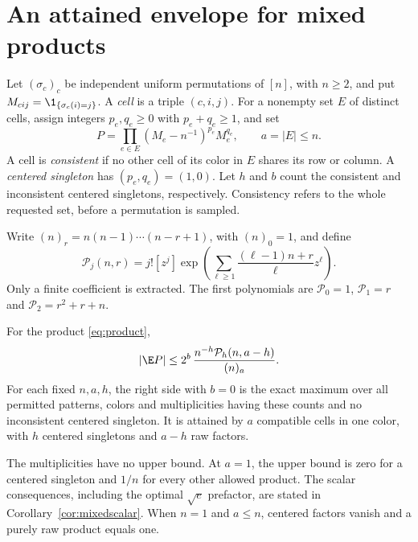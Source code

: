 \section{An attained envelope for mixed products}\label{sec:mixed}

Let $(\sigma_c)_c$ be independent uniform permutations of $[n]$, with $n\ge2$, and put $M_{cij}=\1_{\{\sigma_c(i)=j\}}$. A \emph{cell} is a triple $(c,i,j)$. For a nonempty set $E$ of distinct cells, assign integers $p_e,q_e\ge0$ with $p_e+q_e\ge1$, and set
\begin{equation}\label{eq:product}
P=\prod_{e\in E}(M_e-n^{-1})^{p_e}M_e^{q_e},\qquad a=|E|\le n.
\end{equation}
A cell is \emph{consistent} if no other cell of its color in $E$ shares its row or column. A \emph{centered singleton} has $(p_e,q_e)=(1,0)$. Let $h$ and $b$ count the consistent and inconsistent centered singletons, respectively. Consistency refers to the whole requested set, before a permutation is sampled.

Write $(n)_r=n(n-1)\cdots(n-r+1)$, with $(n)_0=1$, and define
\begin{equation}\label{eq:depletedpoly}
\mathcal P_j(n,r)
=j![z^j]\exp\left(\sum_{\ell\ge1}
\frac{(\ell-1)n+r}{\ell}z^\ell\right).
\end{equation}
Only a finite coefficient is extracted. The first polynomials are
$\mathcal P_0=1$, $\mathcal P_1=r$ and $\mathcal P_2=r^2+r+n$.

\begin{theorem}\label{thm:mixed}
For the product \eqref{eq:product},
\begin{equation}\label{eq:mixedexact}
|\E P|\le 2^b\,\frac{n^{-h}\mathcal P_h(n,a-h)}{(n)_a}.
\end{equation}
For each fixed $n,a,h$, the right side with $b=0$ is the exact maximum over all permitted patterns, colors and multiplicities having these counts and no inconsistent centered singleton. It is attained by $a$ compatible cells in one color, with $h$ centered singletons and $a-h$ raw factors.
\end{theorem}

The multiplicities have no upper bound. At $a=1$, the upper bound is zero for a centered singleton and $1/n$ for every other allowed product. The scalar consequences, including the optimal $\sqrt e$ prefactor, are stated in Corollary~\ref{cor:mixedscalar}. When $n=1$ and $a\le n$, centered factors vanish and a purely raw product equals one.

